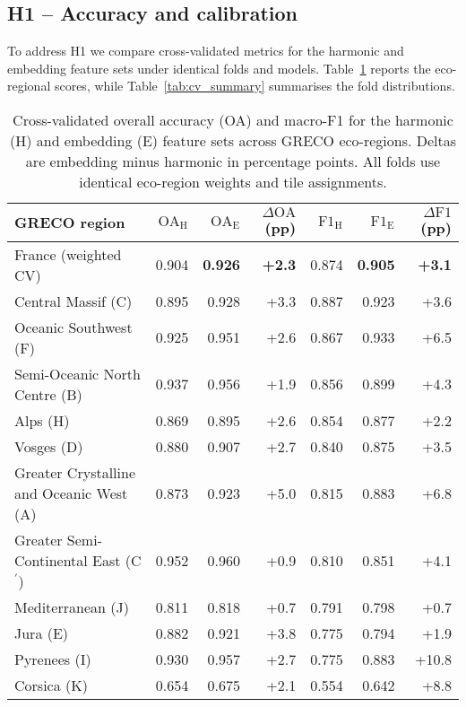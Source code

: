 \documentclass[utf8]{FrontiersinHarvard}
\begin{document}
\subsection{H1 -- Accuracy and calibration}
To address H1 we compare cross-validated metrics for the harmonic and embedding feature sets under identical folds and models. Table~\ref{tab:regional_performance} reports the eco-regional scores, while Table~\ref{tab:cv_summary} summarises the fold distributions.
\begin{table}[H]
    \centering
    \small
    \begin{tabular}{lrrrrrr}
        \toprule
        \textbf{GRECO region} & $\mathrm{OA}_{\mathrm{H}}$ & $\mathrm{OA}_{\mathrm{E}}$ & $\Delta\mathrm{OA}$ (pp) & $\mathrm{F1}_{\mathrm{H}}$ & $\mathrm{F1}_{\mathrm{E}}$ & $\Delta\mathrm{F1}$ (pp) \\
        \midrule
        France (weighted CV) & 0.904 & \textbf{0.926} & \textbf{+2.3} & 0.874 & \textbf{0.905} & \textbf{+3.1} \\
        Central Massif (C) & 0.895 & 0.928 & +3.3 & 0.887 & 0.923 & +3.6 \\
        Oceanic Southwest (F) & 0.925 & 0.951 & +2.6 & 0.867 & 0.933 & +6.5 \\
        Semi-Oceanic North Centre (B) & 0.937 & 0.956 & +1.9 & 0.856 & 0.899 & +4.3 \\
        Alps (H) & 0.869 & 0.895 & +2.6 & 0.854 & 0.877 & +2.2 \\
        Vosges (D) & 0.880 & 0.907 & +2.7 & 0.840 & 0.875 & +3.5 \\
        Greater Crystalline and Oceanic West (A) & 0.873 & 0.923 & +5.0 & 0.815 & 0.883 & +6.8 \\
        Greater Semi-Continental East (C$^\prime$) & 0.952 & 0.960 & +0.9 & 0.810 & 0.851 & +4.1 \\
        Mediterranean (J) & 0.811 & 0.818 & +0.7 & 0.791 & 0.798 & +0.7 \\
        Jura (E) & 0.882 & 0.921 & +3.8 & 0.775 & 0.794 & +1.9 \\
        Pyrenees (I) & 0.930 & 0.957 & +2.7 & 0.775 & 0.883 & +10.8 \\
        Corsica (K) & 0.654 & 0.675 & +2.1 & 0.554 & 0.642 & +8.8 \\
        \bottomrule
    \end{tabular}
    \caption{Cross-validated overall accuracy (OA) and macro-F1 for the harmonic (H) and embedding (E) feature sets across GRECO eco-regions. Deltas are embedding minus harmonic in percentage points. All folds use identical eco-region weights and tile assignments.}
    \label{tab:regional_performance}
\end{table}
\end{document}
